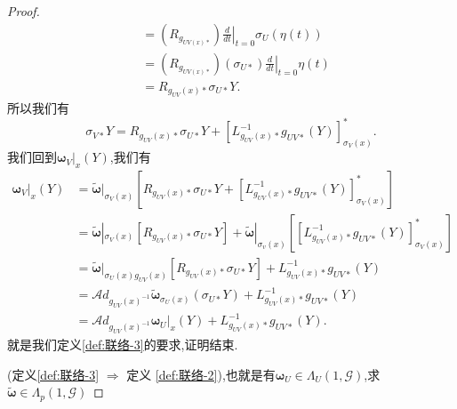 \documentclass[../main.tex]{subfiles}
\begin{document}
\begin{proof}
\begin{align*}
                                                                & = (R_{g_{UV(x)*}})\left.\frac{d}{dt} \right|_{t = 0} \sigma_U(\eta(t))\\
                                                                & = (R_{g_{UV(x)*}})(\sigma_{U*})\left.\frac{d}{dt} \right|_{t = 0} \eta(t)\\
                                                                &= R_{g_{UV}(x)*}\sigma_{U*}Y
.\end{align*}
所以我们有
\begin{equation}
  \sigma_{V*}Y =  R_{g_{UV}(x)*}\sigma_{U*}Y + [L^{-1}_{g_{UV}(x)*}g_{UV*}(Y)]^*_{\sigma_V(x)}
  .\label{eq:I-2-6}
\end{equation}
我们回到$\bm{\omega}_V|_x(Y)$,我们有
\begin{align*}
  \bm{\omega}_V|_x(Y)& =\bm{\tilde{\omega}}|_{\sigma_V(x)}[R_{g_{UV}(x)*}\sigma_{U*}Y + [L^{-1}_{g_{UV}(x)*}g_{UV*}(Y)]^*_{\sigma_V(x)}]\\
                     & = \bm{\tilde{\omega}}|_{\sigma_V(x)}[R_{g_{UV}(x)*}\sigma_{U*}Y ]+\bm{\tilde{\omega}}|_{\sigma_v(x)}[[L^{-1}_{g_{UV}(x)*}g_{UV*}(Y)]^*_{\sigma_V(x)}]\\
                     & = \bm{\tilde{\omega}}|_{\sigma_U(x)g_{UV}(x)}[R_{g_{UV}(x)*}\sigma_{U*}Y ] +L^{-1}_{g_{UV}(x)*}g_{UV*}(Y)\\
                     & = \mathscr{A}\!d_{g_{UV}(x)^{-1}}\bm{\tilde{\omega}}_{\sigma_U(x)}(\sigma_{U*}Y)+ L^{-1}_{g_{UV}(x)*}g_{UV*}(Y)\\
                     & = \mathscr{A}\!d_{g_{UV}(x)^{-1}}\bm{\omega}_{U}|_x(Y)+ L^{-1}_{g_{UV}(x)*}g_{UV*}(Y)
.\end{align*}
就是我们定义\ref{def:联络-3}的要求,证明结束.

(定义\ref{def:联络-3} $\Rightarrow$ 定义 \ref{def:联络-2}),也就是有$\bm{\omega}_U \in \Lambda_U(1,\mathscr{G}) $,求$\bm{\tilde{\omega}} \in \Lambda_p(1,\mathscr{G})$ 


\end{proof}
\end{document}
